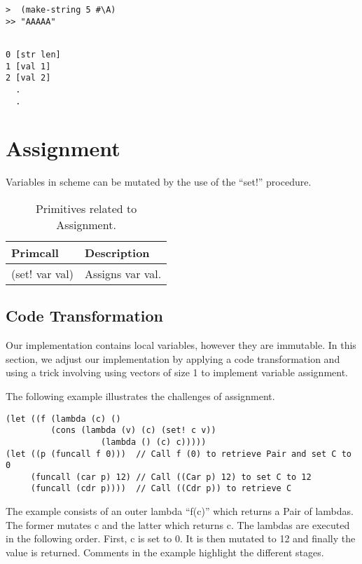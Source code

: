 \documentclass{article}
\begin{document}
\begin{verbatim}
>  (make-string 5 #\A)
>> "AAAAA"

\end{verbatim}

\begin{verbatim}

0 [str len]
1 [val 1]
2 [val 2]
  .
  .

\end{verbatim}



\section{Assignment}

Variables in scheme can be mutated by the use of the ``set!'' procedure.  

\begin{table}[ht]
  \centering
\begin{tabular}{ l l }
  \toprule
  Primcall & Description \\ \hline
  \midrule
  (set! var val) & Assigns var val.  \\
  \bottomrule
\end{tabular}
\caption{Primitives related to Assignment.} \label{tab:assignment}
\end{table}

\subsection{Code Transformation}

Our implementation contains local variables, however they are immutable. In this section, we adjust our implementation by applying a code transformation and using a trick involving using vectors of size 1 to implement variable assignment. 

The following example illustrates the challenges of assignment.

\begin{verbatim}
(let ((f (lambda (c) ()
     	 (cons (lambda (v) (c) (set! c v))
	       	       (lambda () (c) c)))))
(let ((p (funcall f 0)))  // Call f (0) to retrieve Pair and set C to 0
     (funcall (car p) 12) // Call ((Car p) 12) to set C to 12
     (funcall (cdr p))))  // Call ((Cdr p)) to retrieve C

\end{verbatim}

The example consists of an outer lambda ``f(c)'' which returns a Pair of lambdas. The former mutates c and the latter which returns c. The lambdas are executed in the following order. First, c is set to 0. It is then mutated to 12 and finally the value is returned. Comments in the example highlight the different stages.
\end{document}
